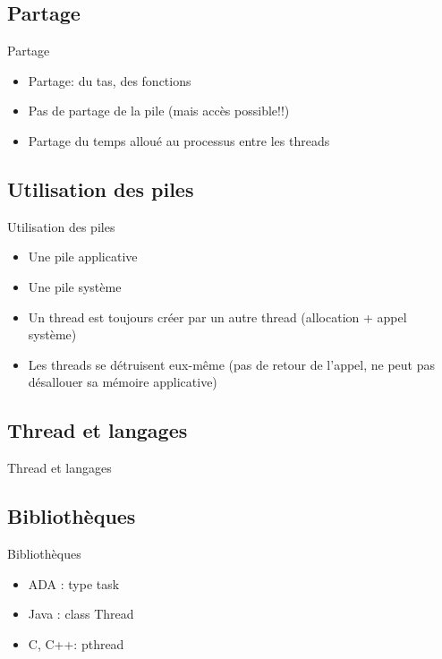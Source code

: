 \subsection{\sectitle}
\begin{frame}{\sectitle}
    \def\subsectitle{Partage}
    \subsection{\subsectitle}
    \begin{block}{\subsectitle}
        \begin{itemize}
            \item Partage: du tas, des fonctions
            \item Pas de partage de la pile (mais accès possible!!)
            \item Partage du temps alloué au processus entre les threads 
        \end{itemize}
    \end{block}

    \def\subsectitle{Utilisation des piles}
    \subsection{\subsectitle}
    \begin{block}{\subsectitle}
        \begin{itemize}
            \item Une pile applicative
            \item Une pile système
            \item Un thread est toujours créer par un autre thread (allocation +
                appel système)
            \item Les threads se détruisent eux-même (pas de retour de l'appel,
                ne peut pas désallouer sa mémoire applicative)
        \end{itemize}
    \end{block}
\end{frame}

\def\sectitle{Thread et langages}
\subsection{\sectitle}
\begin{frame}{\sectitle}
    \def\subsectitle{Bibliothèques}
    \subsection{\subsectitle}
    \begin{block}{\subsectitle}
        \begin{itemize}
            \item ADA : type task
            \item Java : class Thread
            \item C, C++: pthread
        \end{itemize}
    \end{block}
\end{frame}

